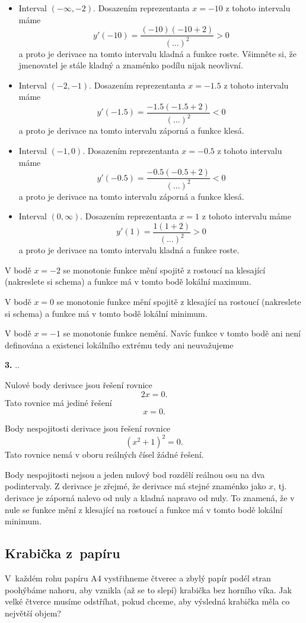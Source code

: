 \begin{itemize}
\item Interval $(-\infty,-2)$. Dosazením reprezentanta $x=-10$ z tohoto intervalu máme $$y'(-10)=\frac{(-10)(-10+2)}{(\dots )^2}>0$$ a proto je derivace na tomto intervalu kladná a funkce roste. Všimněte si, že jmenovatel je stále kladný a znaménko podílu nijak neovlivní.
\item Interval $(-2,-1)$. Dosazením reprezentanta $x=-1.5$ z tohoto intervalu máme $$y'(-1.5)=\frac{-1.5(-1.5+2)}{(\dots)^2}<0$$ a proto je derivace na tomto intervalu záporná a funkce klesá.
\item Interval $(-1,0)$. Dosazením reprezentanta $x=-0.5$ z tohoto intervalu máme $$y'(-0.5)=\frac{-0.5(-0.5+2)}{(\dots)^2}<0$$ a proto je derivace na tomto intervalu záporná a funkce klesá.
  \item Interval $(0,\infty)$. Dosazením reprezentanta $x=1$ z tohoto intervalu máme $$y'(1)=\frac{1(1+2)}{(\dots)^2}>0$$ a proto je derivace na tomto intervalu kladná a funkce roste.
  \end{itemize}

  V bodě $x=-2$ se monotonie funkce mění spojitě z rostoucí na klesající (nakreslete si schema) a funkce má v tomto bodě lokální maximum.

  V bodě $x=0$ se monotonie funkce mění spojitě z klesající na rostoucí (nakreslete si schema) a funkce má v tomto bodě lokální minimum.

  V bodě $x=-1$ se monotonie funkce nemění. Navíc funkce v tomto bodě ani není definována a existenci lokálního extrému tedy ani neuvažujeme

    
\textbf{3. }\priklad {}..

Nulové body derivace jsou řešení rovnice $$2x=0.$$ Tato rovnice má jediné řešení $$x=0.$$

Body nespojitosti derivace jsou řešení rovnice $$(x^2+1)^2=0.$$ Tato rovnice nemá v oboru reálných čísel žádné řešení.

Body nespojitosti nejsou a jeden nulový bod rozdělí reálnou osu na dva podintervaly. Z derivace je zřejmé, že derivace má stejné znaménko jako $x$, tj. derivace je záporná nalevo od nuly a kladná napravo od nuly. To znamená, že v nule se funkce mění z klesající na rostoucí a funkce má v tomto bodě lokální minimum. 
  

\konec

\subsection{Krabička z papíru}  V každém rohu papíru A4 vystřihneme
čtverec a zbylý papír podél stran poohýbáme nahoru, aby vznikla (až se
to slepí) krabička bez horního víka. Jak velké čtverce musíme
odstříhat, pokud chceme, aby výsledná
krabička měla co největší objem?


